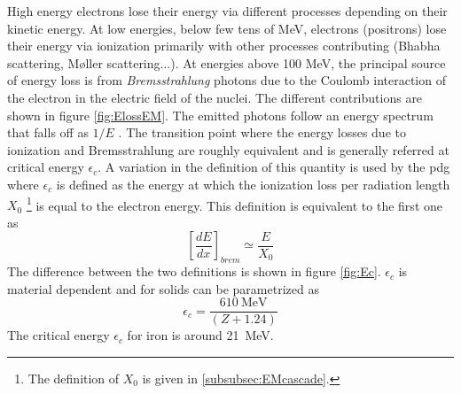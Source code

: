 High energy electrons lose their energy via different processes depending on their kinetic energy. At low energies, below few tens of MeV, electrons (positrons) lose their energy via ionization primarily with other processes contributing (Bhabha scattering, M\o{}ller scattering...). At energies above 100 MeV, the principal source of energy loss is from \textit{Brems\-strah\-lung} photons due to the Coulomb interaction of the electron in the electric field of the nuclei. The different contributions are shown in figure \ref{fig:ElossEM}. The emitted photons follow an energy spectrum that falls off as $1/E$ \cite{Wigmans:392793}. The transition point where the energy losses due to ionization and Bremsstrahlung are roughly equivalent and is generally referred at critical energy $\epsilon_{c}$. A variation in the definition of this quantity is used by the \acrshort{pdg} where $\epsilon_{c}$ is defined as the energy at which the ionization loss per radiation length $X_0$ \footnote{The definition of $X_0$ is given in \ref{subsubsec:EMcascade}.} is equal to the electron energy. This definition is equivalent to the first one as
\begin{equation}
  \left[\frac{dE}{dx}\right]_{brem} \simeq \frac{E}{X_0}
\end{equation}
The difference between the two definitions is shown in figure \ref{fig:Ec}. $\epsilon_{c}$ is material dependent and for solids can be parametrized as
\begin{equation}
  \epsilon_{c} = \frac{\SI{610}{\mega\eV}}{(Z + 1.24)}
\end{equation}
The critical energy $\epsilon_{c}$ for iron is around \SI{21}{\mega\eV}.


